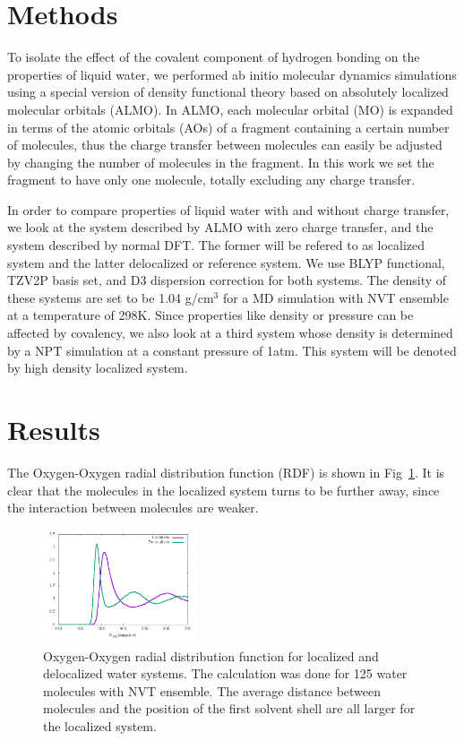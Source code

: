 \documentclass[prl,twocolumn,showpacs]{revtex4}
\begin{document}
\section{Methods}

To isolate the effect of the covalent component of hydrogen bonding on the properties of liquid water, we performed ab initio molecular dynamics simulations using a special version of density functional theory based on absolutely localized molecular orbitals (ALMO)\cite{khaliullin2006efficient,Khaliullin2013JCTC}. In ALMO, each molecular orbital (MO) is expanded in terms of the atomic orbitals (AOs) of a fragment containing a certain number of molecules, thus the charge transfer between molecules can easily be adjusted by changing the number of molecules in the fragment. In this work we set the fragment to have only one molecule, totally excluding any charge transfer. 
 \old


In order to compare properties of liquid water with and without charge transfer, we look at the system described by ALMO with zero charge transfer, and the system described by normal DFT. The former will be refered to as localized system and the latter delocalized or reference system. We use BLYP functional, TZV2P basis set, and D3 dispersion correction for both systems. The density of these systems are set to be 1.04 g/cm$^3$ for a MD simulation with NVT ensemble at a temperature of 298K. Since properties like density or pressure can be affected by covalency, we also look at a third system whose density is determined by a NPT simulation at a constant pressure of 1atm. This system will be denoted by high density localized system.



\section{Results}

The Oxygen-Oxygen radial distribution function (RDF) is shown in Fig~\ref{Fig:RDF}. It is clear that the molecules in the localized system turns to be further away, since the interaction between molecules are weaker. 

\begin{figure}
\includegraphics[width=0.4\textwidth]{RDF}
\caption{Oxygen-Oxygen radial distribution function for localized and delocalized water systems. The calculation was done for  125 water molecules with NVT ensemble. The average distance between molecules and the position of the first solvent shell are all larger for the localized system.} \label{Fig:RDF}
\end{figure}
\end{document}
